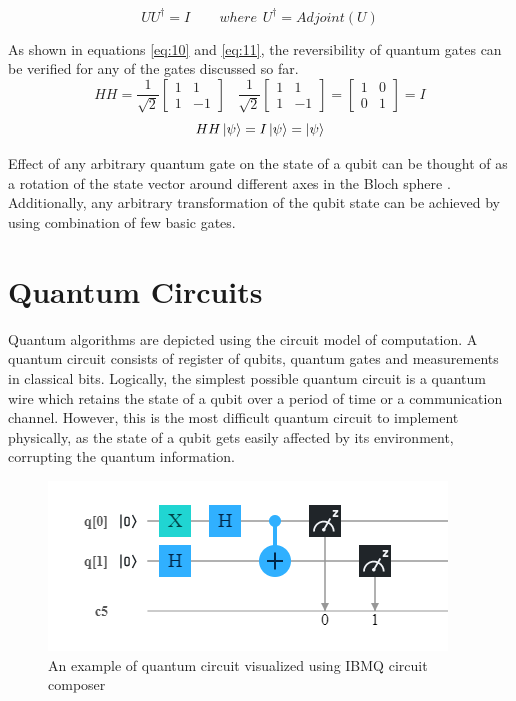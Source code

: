 \documentclass[english,a4paper,11pt,oneside,onecolumn]{book}
\begin{document}
\begin{equation}\label{eq:9}
UU^\dagger = I \hspace{25pt} where \hspace{5pt}U^\dagger = Adjoint(U)
\end{equation}

As shown in equations \ref{eq:10} and \ref{eq:11}, the reversibility of quantum gates can be verified for any of the gates discussed so far. 
\begin{equation}\label{eq:10}
HH = 
\dfrac{1}{\sqrt{2}}
\begin{bmatrix}
1 & 1\\
1 & -1
\end{bmatrix}
\hspace{10pt}
\dfrac{1}{\sqrt{2}}
\begin{bmatrix}
1 & 1\\
1 & -1
\end{bmatrix}
=
\begin{bmatrix}
1 & 0\\
0 & 1
\end{bmatrix}
=I
\end{equation}
\begin{equation}\label{eq:11}
HH\ket{\psi} = I \ket{\psi} = \ket{\psi}
\end{equation}

Effect of any arbitrary quantum gate on the state of a qubit can be thought of as a rotation of the state vector around different axes in the Bloch sphere \cite{nielsen_2019_quantum}. Additionally, any arbitrary transformation of the qubit state can be achieved by using combination of few basic gates.

\section{Quantum Circuits}
\label{sec:qCirc}
Quantum algorithms are depicted using the circuit model of computation. A quantum circuit consists of register of qubits, quantum gates and measurements in classical bits. Logically, the simplest possible quantum circuit is a quantum wire which retains the state of a qubit over a period of time or a communication channel. However, this is the most difficult quantum circuit to implement physically, as the state of a qubit gets easily affected by its environment, corrupting the quantum information. 

\begin{figure}[H]
    \centering
    \includegraphics[scale=0.7]{Images/quantumCircuitExample.png}
    \caption{An example of quantum circuit visualized using IBMQ circuit composer \cite{asfaw_2020_learn}}
    \label{fig:qCircEx}
\end{figure}
\end{document}
